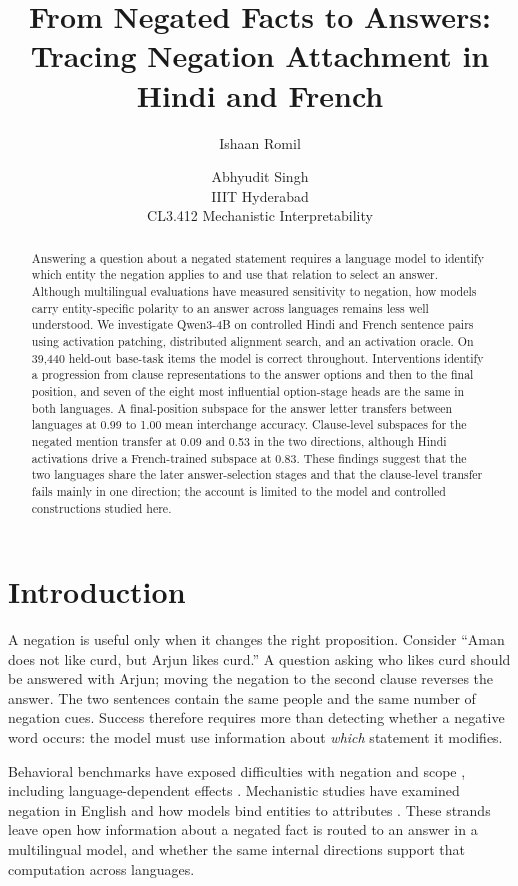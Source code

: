 \documentclass[11pt]{article}
\title{From Negated Facts to Answers: Tracing Negation Attachment in Hindi and French}
\author{Ishaan Romil \and Abhyudit Singh \\
  IIIT Hyderabad \\
  CL3.412 Mechanistic Interpretability}
\begin{document}
\maketitle

\begin{abstract}
Answering a question about a negated statement requires a language model to identify which entity the negation applies to and use that relation to select an answer.
Although multilingual evaluations have measured sensitivity to negation, how models carry entity-specific polarity to an answer across languages remains less well understood.
We investigate Qwen3-4B on controlled Hindi and French sentence pairs using activation patching, distributed alignment search, and an activation oracle.
On 39,440 held-out base-task items the model is correct throughout. Interventions identify a progression from clause representations to the answer options and then to the final position, and seven of the eight most influential option-stage heads are the same in both languages.
A final-position subspace for the answer letter transfers between languages at 0.99 to 1.00 mean interchange accuracy. Clause-level subspaces for the negated mention transfer at 0.09 and 0.53 in the two directions, although Hindi activations drive a French-trained subspace at 0.83.
These findings suggest that the two languages share the later answer-selection stages and that the clause-level transfer fails mainly in one direction; the account is limited to the model and controlled constructions studied here.
\end{abstract}

\section{Introduction}
\label{sec:intro}
A negation is useful only when it changes the right proposition. Consider ``Aman does not like curd, but Arjun likes curd.'' A question asking who likes curd should be answered with Arjun; moving the negation to the second clause reverses the answer. The two sentences contain the same people and the same number of negation cues. Success therefore requires more than detecting whether a negative word occurs: the model must use information about \emph{which} statement it modifies.

Behavioral benchmarks have exposed difficulties with negation and scope \citep{kassner2020negated,she2023scone}, including language-dependent effects \citep{hartmann2021multilingual,vrabcova2025roots}. Mechanistic studies have examined negation in English \citep{zhou2026negation} and how models bind entities to attributes \citep{feng2024binding,gurarieh2026mixing}. These strands leave open how information about a negated fact is routed to an answer in a multilingual model, and whether the same internal directions support that computation across languages.
\end{document}
